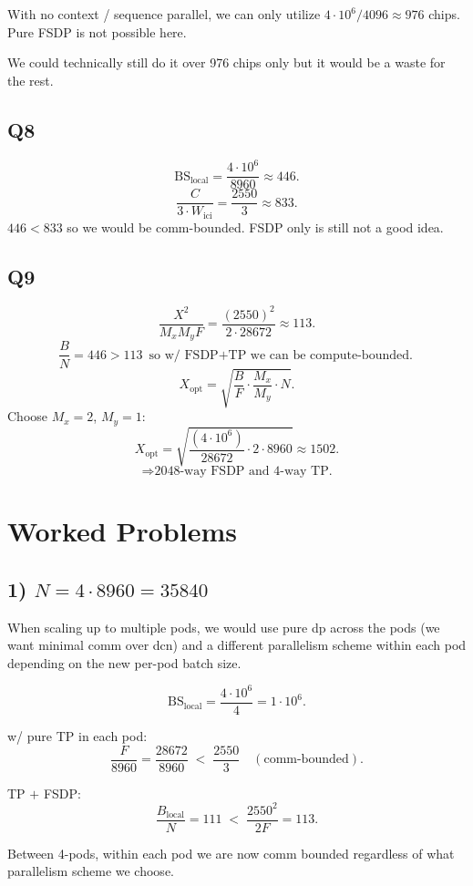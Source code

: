 \documentclass[11pt]{article}
\newcommand{\Wici}{W_{\text{ici}}}
\begin{document}
With no context / sequence parallel, we can only utilize $4 \cdot 10^6 / 4096 \approx 976$ chips. Pure FSDP is not possible here.

We could technically still do it over 976 chips only but it would be a waste for the rest.

\subsection*{Q8}

\[
\text{BS}_{\text{local}} = \frac{4 \cdot 10^6}{8960} \approx 446.
\]
\[
\frac{C}{3 \cdot \Wici} = \frac{2550}{3} \approx 833.
\]
$446 < 833$ so we would be comm-bounded. FSDP only is still not a good idea.

\subsection*{Q9}

\[
\frac{X^2}{M_x M_y F} = \frac{(2550)^2}{2 \cdot 28672} \approx 113.
\]
\[
\frac{B}{N} = 446 > 113 \;\text{so w/ FSDP$+$TP we can be compute-bounded.}
\]
\[
X_{\text{opt}} = \sqrt{\frac{B}{F} \cdot \frac{M_x}{M_y} \cdot N}.
\]
Choose $M_x = 2$, $M_y = 1$:
\[
X_{\text{opt}} = \sqrt{\frac{(4 \cdot 10^6)}{28672} \cdot 2 \cdot 8960} \approx 1502.
\]
\[
\Rightarrow \text{2048-way FSDP and 4-way TP.}
\]

\section*{Worked Problems}

\subsection*{1) $N = 4 \cdot 8960 = 35840$}

When scaling up to multiple pods, we would use pure dp across the pods (we want minimal comm over dcn) and a different parallelism scheme within each pod depending on the new per-pod batch size.

\[
\text{BS}_{\text{local}} = \frac{4 \cdot 10^6}{4} = 1 \cdot 10^6.
\]

w/ pure TP in each pod:
\[
\frac{F}{8960} = \frac{28672}{8960} \;<\; \frac{2550}{3} \quad (\text{comm-bounded}).
\]

TP $+$ FSDP:
\[
\frac{B_{\text{local}}}{N} = 111 \;<\; \frac{2550^2}{2F} = 113.
\]

Between 4-pods, within each pod we are now comm bounded regardless of what parallelism scheme we choose.
\end{document}
